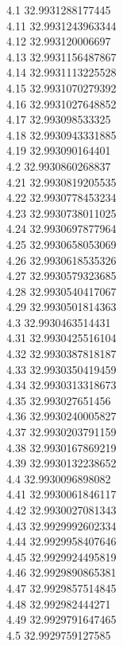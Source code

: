 {4.1	32.9931288177445\\
4.11	32.9931243963344\\
4.12	32.993120006697\\
4.13	32.9931156487867\\
4.14	32.9931113225528\\
4.15	32.9931070279392\\
4.16	32.9931027648852\\
4.17	32.993098533325\\
4.18	32.9930943331885\\
4.19	32.993090164401\\
4.2	32.9930860268837\\
4.21	32.9930819205535\\
4.22	32.9930778453234\\
4.23	32.9930738011025\\
4.24	32.9930697877964\\
4.25	32.9930658053069\\
4.26	32.9930618535326\\
4.27	32.9930579323685\\
4.28	32.9930540417067\\
4.29	32.9930501814363\\
4.3	32.9930463514431\\
4.31	32.9930425516104\\
4.32	32.9930387818187\\
4.33	32.9930350419459\\
4.34	32.9930313318673\\
4.35	32.993027651456\\
4.36	32.9930240005827\\
4.37	32.9930203791159\\
4.38	32.9930167869219\\
4.39	32.9930132238652\\
4.4	32.9930096898082\\
4.41	32.9930061846117\\
4.42	32.9930027081343\\
4.43	32.9929992602334\\
4.44	32.9929958407646\\
4.45	32.9929924495819\\
4.46	32.9929890865381\\
4.47	32.9929857514845\\
4.48	32.992982444271\\
4.49	32.9929791647465\\
4.5	32.9929759127585\\
}
